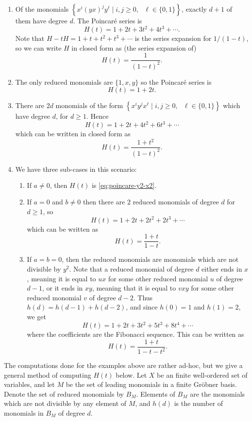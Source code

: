 \begin{enumerate}
	\item Of the monomials $\left\{x^i(yx)^jy^\ell\mid i,j\ge 0,\text{ }\ell\in\{0,1\}\right\}$, exactly $d+1$ of them have degree $d$. The Poincar\'e series is
	\begin{equation}
		H(t) = 1 + 2t + 3t^2 + 4t^3 + \cdots.\label{eq:poincare-y2-x2}
	\end{equation}
	Note that $H - tH = 1 + t + t^2 + t^3 + \cdots$ is the series expansion for $1/(1-t)$, so we can write $H$ in closed form as (the series expansion of)
	\[
		H(t) = \frac{1}{(1-t)^2}.
	\]
	\item The only reduced monomials are $\{1,x,y\}$ so the Poincar\'e series is
	\[
		H(t) = 1 + 2t.
	\]
	\setcounter{enumi}{3}
	\item There are $2d$ monomials of the form $\left\{x^iy^jx^\ell\mid i,j\ge 0,\text{ }\ell\in\{0,1\}\right\}$ which have degree $d$, for $d \geq 1$. Hence
	\[
		H(t) = 1 + 2t + 4t^2 + 6t^3 + \cdots
	\]
	which can be written in closed form as
	\[
		H(t) = \frac{1+t^2}{(1-t)^2}.
	\]
	\item We have three sub-cases in this scenario:
	\begin{enumerate}
		\item If $a\neq 0$, then $H(t)$ is \eqref{eq:poincare-y2-x2}.
		\item If $a = 0$ and $b\neq 0$ then there are $2$ reduced monomials of degree $d$ for $d \geq 1$, so
		\[
			H(t) = 1 + 2t + 2t^2 + 2t^3 + \cdots
		\]
		which can be written as
		\[
			H(t) = \frac{1+t}{1-t}.
		\]
		\item If $a = b = 0$, then the reduced monomials are monomials which are not divisible by $y^2$. Note that a reduced monomial of degree $d$ either ends in $x$, meaning it is equal to $ux$ for some other reduced monomial $u$ of degree $d-1$, or it ends in $xy$, meaning that it is equal to $vxy$ for some other reduced monomial $v$ of degree $d-2$. Thus $h(d) = h(d-1) + h(d-2)$, and since $h(0) = 1$ and $h(1) = 2$, we get
		\[
			H(t) = 1 + 2t + 3t^2 + 5t^3 + 8t^4 + \cdots
		\] 
		where the coefficients are the Fibonacci sequence. This can be written as
		\[
			H(t) = \frac{1 + t}{1 - t - t^2}.
		\]
	\end{enumerate}
\end{enumerate}
The computations done for the examples above are rather ad-hoc, but we give a general method of computing $H(t)$ below. Let $X$ be an finite well-ordered set of variables, and let $M$ be the set of leading monomials in a finite Gr\"obner basis. Denote the set of reduced monomials by $B_M$. Elements of $B_M$ are the monomials which are not divisible by any element of $M$, and $h(d)$ is the number of monomials in $B_M$ of degree $d$.

